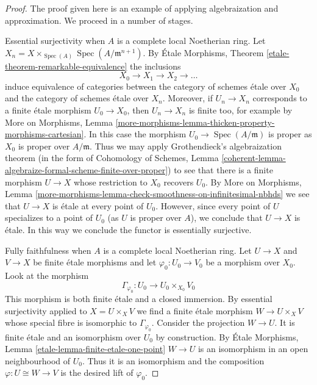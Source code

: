 \documentclass{stacks-project}
\theoremstyle{plain}
\theoremstyle{definition}
\theoremstyle{remark}
\numberwithin{equation}{subsection}
\def\Spec{\mathop{\mathrm{Spec}}}
\begin{document}
\begin{proof}
The proof given here is an example of applying algebraization and
approximation. We proceed in a number of stages.

\medskip\noindent
Essential surjectivity when $A$ is a complete local Noetherian ring.
Let $X_n = X \times_{\Spec(A)} \Spec(A/\mathfrak m^{n + 1})$.
By \'Etale Morphisms, Theorem \ref{etale-theorem-remarkable-equivalence}
the inclusions
$$
X_0 \to X_1 \to X_2 \to \ldots
$$
induce equivalence of categories between the category
of schemes \'etale over $X_0$ and the category of schemes
\'etale over $X_n$.
Moreover, if $U_n \to X_n$ corresponds to a finite \'etale
morphism $U_0 \to X_0$, then $U_n \to X_n$ is finite too, for example
by More on Morphisms, Lemma
\ref{more-morphisms-lemma-thicken-property-morphisms-cartesian}.
In this case the morphism $U_0 \to \Spec(A/\mathfrak m)$
is proper as $X_0$ is proper over $A/\mathfrak m$. Thus we may apply
Grothendieck's algebraization theorem
(in the form of
Cohomology of Schemes, Lemma
\ref{coherent-lemma-algebraize-formal-scheme-finite-over-proper})
to see that there is a finite morphism $U \to X$ whose restriction
to $X_0$ recovers $U_0$. By More on Morphisms, Lemma
\ref{more-morphisms-lemma-check-smoothness-on-infinitesimal-nbhds}
we see that $U \to X$ is \'etale at every point of $U_0$.
However, since every point of $U$ specializes to a point of $U_0$
(as $U$ is proper over $A$), we conclude that $U \to X$ is \'etale.
In this way we conclude the functor is essentially surjective.

\medskip\noindent
Fully faithfulness when $A$ is a complete local Noetherian ring.
Let $U \to X$ and $V \to X$ be finite \'etale morphisms and
let $\varphi_0 : U_0 \to V_0$ be a morphism over $X_0$. Look at
the morphism
$$
\Gamma_{\varphi_0} : U_0 \longrightarrow U_0 \times_{X_0} V_0
$$
This morphism is both finite \'etale and a closed immersion.
By essential surjectivity applied to $X = U \times_X V$ we find
a finite \'etale morphism $W \to U \times_X V$ whose special
fibre is isomorphic to $\Gamma_{\varphi_0}$. Consider the projection
$W \to U$. It is finite \'etale and an isomorphism over $U_0$ by
construction. By \'Etale Morphisms, Lemma
\ref{etale-lemma-finite-etale-one-point}
$W \to U$ is an isomorphism in an open neighbourhood of $U_0$.
Thus it is an isomorphism and the composition $\varphi : U \cong W \to V$
is the desired lift of $\varphi_0$.


\end{proof}
\end{document}
